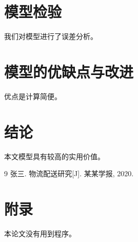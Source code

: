 \documentclass[12pt,a4paper]{ctexart}
\begin{document}
\section{模型检验}
我们对模型进行了误差分析。

\section{模型的优缺点与改进}
优点是计算简便。

\section{结论}
本文模型具有较高的实用价值。

\begin{thebibliography}{9}
 张三. 物流配送研究[J]. 某某学报, 2020.
\end{thebibliography}

\appendix
\section{附录}
本论文没有用到程序。
\end{document}
